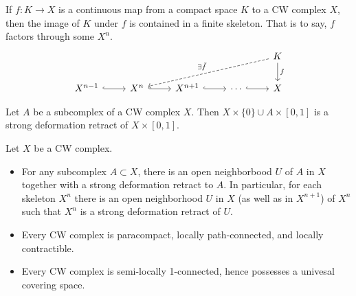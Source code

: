 \documentclass[main.tex]{subfiles}
\begin{document}
\begin{corollary}
  \label{cor:map_of_compact_into_CW_factors_through_some_skeleton}
  If $f\colon K \to X$ is a continuous map from a compact space $K$ to a CW complex $X$, then the image of $K$ under $f$ is contained in a finite skeleton. That is to say, $f$ factors through some $X^{n}$.
  \begin{equation*}
    \begin{tikzcd}
      &&&& K
      \arrow[d, "f"]
      \arrow[dlll, dashed, swap, "\exists \tilde{f}"]
      \\
      X^{n-1}
      \arrow[r, hook]
      & X^{n}
      \arrow[r, hook]
      & X^{n+1}
      \arrow[r, hook]
      & \cdots
      \arrow[r, hook]
      & X
    \end{tikzcd}
  \end{equation*}
\end{corollary}

\begin{proposition}
  Let $A$ be a subcomplex of a CW complex $X$. Then $X \times \{0\} \cup A \times [0, 1]$ is a strong deformation retract of $X \times [0, 1]$.
\end{proposition}

\begin{lemma}
  \label{lemma:unproved_properties_of_cw_complexes}
  Let $X$ be a CW complex.
  \begin{itemize}
    \item For any subcomplex $A \subset X$, there is an open neighborbood $U$ of $A$ in $X$ together with a strong deformation retract to $A$. In particular, for each skeleton $X^{n}$ there is an open neighborhood $U$ in $X$ (as well as in $X^{n+1}$) of $X^{n}$ such that $X^{n}$ is a strong deformation retract of $U$.

    \item Every CW complex is paracompact, locally path-connected, and locally contractible.

    \item Every CW complex is semi-locally 1-connected, hence possesses a univesal covering space.
  \end{itemize}
\end{lemma}
\end{document}
